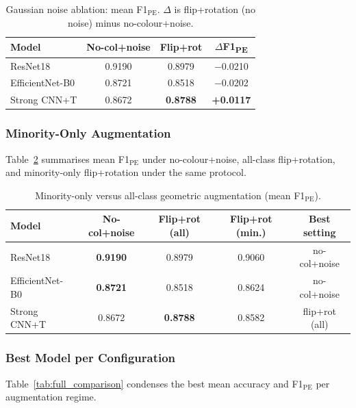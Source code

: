 \documentclass[10pt,journal,compsoc]{IEEEtran}
\begin{document}
\begin{table}[h]
  \caption{Gaussian noise ablation: mean F1$_{\mathrm{PE}}$.
    $\Delta$ is flip+rotation (no noise) minus no-colour+noise.}
  \label{tab:ablation_noise}
  \centering
  \begin{tabular}{lccc}
    \toprule
    \textbf{Model}
      & \textbf{No-col+noise}
      & \textbf{Flip+rot}
      & \textbf{$\Delta$F1\textsubscript{PE}} \\
    \midrule
    ResNet18          & 0.9190 & 0.8979 & $-$0.0210 \\
    EfficientNet-B0   & 0.8721 & 0.8518 & $-$0.0202 \\
    Strong CNN+T      & 0.8672 & \textbf{0.8788} & \textbf{+0.0117} \\
    \bottomrule
  \end{tabular}
\end{table}

\subsubsection{Minority-Only Augmentation}
Table~\ref{tab:ablation_minority} summarises mean F1$_{\mathrm{PE}}$ under
no-colour+noise, all-class flip+rotation, and minority-only
flip+rotation under the same protocol.

\begin{table}[h]
  \caption{Minority-only versus all-class geometric augmentation
    (mean F1$_{\mathrm{PE}}$).}
  \label{tab:ablation_minority}
  \centering
  \setlength{\tabcolsep}{4pt}
  \begin{tabular}{lcccc}
    \toprule
    \textbf{Model}
      & \textbf{No-col+noise}
      & \textbf{Flip+rot (all)}
      & \textbf{Flip+rot (min.)}
      & \textbf{Best setting} \\
    \midrule
    ResNet18
      & \textbf{0.9190} & 0.8979 & 0.9060 & no-col+noise \\
    EfficientNet-B0
      & \textbf{0.8721} & 0.8518 & 0.8624 & no-col+noise \\
    Strong CNN+T
      & 0.8672 & \textbf{0.8788} & 0.8582 & flip+rot (all) \\
    \bottomrule
  \end{tabular}
\end{table}

\subsubsection{Best Model per Configuration}
Table~\ref{tab:full_comparison} condenses the best mean accuracy and
F1$_{\mathrm{PE}}$ per augmentation regime.
\end{document}
